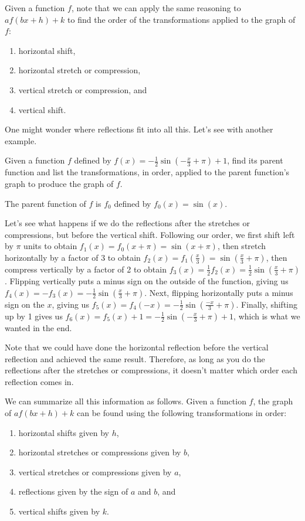 \documentclass[handout, noauthor, nooutcomes]{ximera}
\begin{document}
Given a function $f$, note that we can apply the same reasoning to $af(bx + h) + k$ to find the order of the transformations applied to the graph of $f$:
\begin{enumerate}
\item horizontal shift,
\item horizontal stretch or compression,
\item vertical stretch or compression, and 
\item vertical shift.
\end{enumerate}

One might wonder where reflections fit into all this. Let's see with another example. 

\begin{example}
Given a function $f$ defined by $f(x) = -\frac{1}{2}\sin\left(-\frac{x}{3} + \pi\right) + 1$, find its parent function and list the transformations, in order, applied to the parent function's graph to produce the graph of $f$. 
\begin{explanation}
The parent function of $f$ is $f_0$ defined by $f_0(x) = \sin(x)$. 

Let's see what happens if we do the reflections after the stretches or compressions, but before the vertical shift. Following our order, we first shift left by $\pi$ units to obtain $f_1(x) = f_0(x + \pi) = \sin(x + \pi)$, then stretch horizontally by a factor of 3 to obtain $f_2(x) = f_1\left(\frac{x}{3}\right) = \sin\left(\frac{x}{3} + \pi \right)$, then compress vertically by a factor of 2 to obtain $f_3(x) = \frac{1}{2}f_2(x)= \frac{1}{2}\sin\left(\frac{x}{3} + \pi \right)$. Flipping vertically puts a minus sign on the outside of the function, giving us $f_4(x) = -f_3(x) = - \frac{1}{2}\sin\left(\frac{x}{3} + \pi \right)$. Next, flipping horizontally puts a minus sign on the $x$, giving us $f_5(x) = f_4(-x) = - \frac{1}{2}\sin\left(\frac{-x}{3} + \pi \right)$. Finally, shifting up by 1 gives us $f_6(x) = f_5(x) + 1 = - \frac{1}{2}\sin\left(-\frac{x}{3} + \pi \right) + 1$, which is what we wanted in the end.

Note that we could have done the horizontal reflection before the vertical reflection and achieved the same result. Therefore, as long as you do the reflections after the stretches or compressions, it doesn't matter which order each reflection comes in. 
\end{explanation}
\end{example}

We can summarize all this information as follows. Given a function $f$, the graph of $af(bx + h) + k$ can be found using the following transformations in order:
\begin{enumerate}
\item horizontal shifts given by $h$,
\item horizontal stretches or compressions given by $b$,
\item vertical stretches or compressions given by $a$,
\item reflections given by the sign of $a$ and $b$, and
\item vertical shifts given by $k$.
\end{enumerate}
\end{document}
